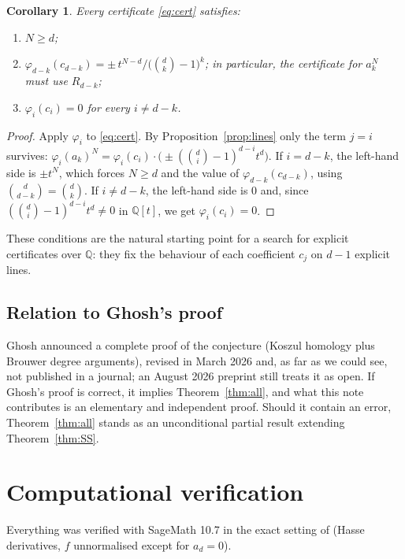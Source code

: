 \documentclass[11pt,reqno]{amsart}
\theoremstyle{plain}
\newtheorem{corollary}[theorem]{Corollary}
\theoremstyle{definition}
\begin{document}
\begin{corollary}\label{cor:certificates}
Every certificate \eqref{eq:cert} satisfies:
\begin{enumerate}
\item $N\ge d$;
\item $\varphi_{d-k}(c_{d-k})=\pm\,t^{N-d}\big/\big(\binom dk-1\big)^{k}$; in
  particular, the certificate for $a_k^N$ \emph{must use} $R_{d-k}$;
\item $\varphi_i(c_i)=0$ for every $i\neq d-k$.
\end{enumerate}
\end{corollary}

\begin{proof}
Apply $\varphi_i$ to \eqref{eq:cert}. By Proposition~\ref{prop:lines} only the
term $j=i$ survives:
$\varphi_i(a_k)^N=\varphi_i(c_i)\cdot\big(\pm(\binom di-1)^{d-i}t^d\big)$. If
$i=d-k$, the left-hand side is $\pm t^N$, which forces $N\ge d$ and the value of
$\varphi_{d-k}(c_{d-k})$, using $\binom d{d-k}=\binom dk$. If $i\neq d-k$, the
left-hand side is $0$ and, since $(\binom di-1)^{d-i}t^d\neq0$ in
$\mathbb{Q}[t]$, we get $\varphi_i(c_i)=0$.
\end{proof}

These conditions are the natural starting point for a search for explicit
certificates over $\mathbb{Q}$: they fix the behaviour of each coefficient $c_j$
on $d-1$ explicit lines.

\subsection{Relation to Ghosh's proof}

Ghosh \cite{Gh25} announced a complete proof of the conjecture (Koszul homology
plus Brouwer degree arguments), revised in March 2026 and, as far as we could
see, not published in a journal; an August 2026 preprint still treats it as open.
If Ghosh's proof is correct, it implies Theorem~\ref{thm:all}, and what this note
contributes is an elementary and independent proof. Should it contain an error,
Theorem~\ref{thm:all} stands as an unconditional partial result extending
Theorem~\ref{thm:SS}.

\section{Computational verification}

Everything was verified with SageMath 10.7 in the exact setting of \cite{SS}
(Hasse derivatives, $f$ unnormalised except for $a_d=0$).
\end{document}
